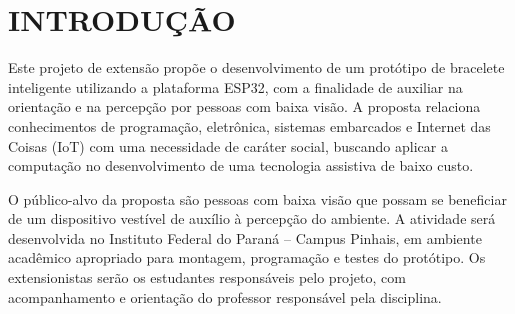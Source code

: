 \chapter{INTRODUÇÃO}
\label{capitulo-introducao}

Este projeto de extensão propõe o desenvolvimento de um protótipo de bracelete inteligente utilizando a plataforma ESP32, com a finalidade de auxiliar na orientação e na percepção por pessoas com baixa visão. A proposta relaciona conhecimentos de programação, eletrônica, sistemas embarcados e Internet das Coisas (IoT) com uma necessidade de caráter social, buscando aplicar a computação no desenvolvimento de uma tecnologia assistiva de baixo custo.

O público-alvo da proposta são pessoas com baixa visão que possam se beneficiar de um dispositivo vestível de auxílio à percepção do ambiente. A atividade será desenvolvida no Instituto Federal do Paraná – Campus Pinhais, em ambiente acadêmico apropriado para montagem, programação e testes do protótipo. Os extensionistas serão os estudantes responsáveis pelo projeto, com acompanhamento e orientação do professor responsável pela disciplina.

